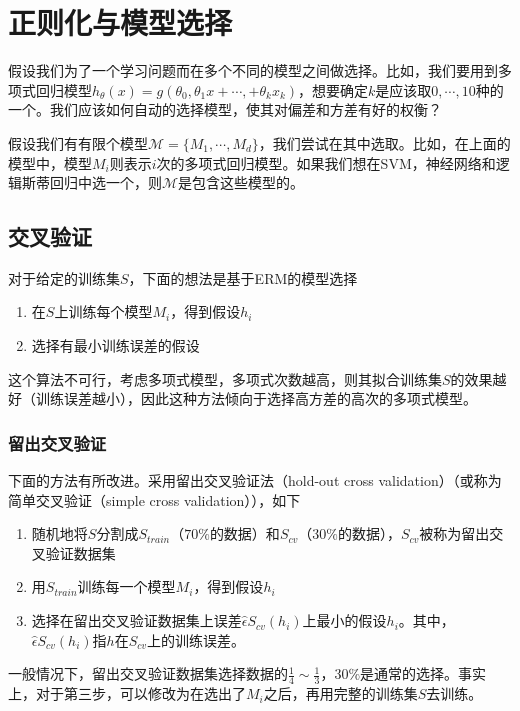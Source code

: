 \section{正则化与模型选择}
假设我们为了一个学习问题而在多个不同的模型之间做选择。比如，我们要用到多项式回归模型$h_\theta(x)=g(\theta_0,\theta_1x+\cdots,+\theta_kx_k)$，想要确定$k$是应该取$0,\cdots,10$种的一个。我们应该如何自动的选择模型，使其对偏差和方差有好的权衡？

假设我们有有限个模型$\mathcal{M}=\{M_1,\cdots,M_d\}$，我们尝试在其中选取。比如，在上面的模型中，模型$M_i$则表示$i$次的多项式回归模型。如果我们想在SVM，神经网络和逻辑斯蒂回归中选一个，则$\mathcal{M}$是包含这些模型的。

\subsection{交叉验证}
对于给定的训练集$S$，下面的想法是基于ERM的模型选择
\begin{enumerate}[1]
\item 在$S$上训练每个模型$M_i$，得到假设$h_i$
\item 选择有最小训练误差的假设
\end{enumerate}

这个算法不可行，考虑多项式模型，多项式次数越高，则其拟合训练集$S$的效果越好（训练误差越小），因此这种方法倾向于选择高方差的高次的多项式模型。
\subsubsection{留出交叉验证}
下面的方法有所改进。采用留出交叉验证法（hold-out cross validation）（或称为简单交叉验证（simple cross validation）），如下
\begin{enumerate}[1]
\item 随机地将$S$分割成$S_{train}$（$70\%$的数据）和$S_{cv}$（$30\%$的数据），$S_{cv}$被称为留出交叉验证数据集
\item 用$S_{train}$训练每一个模型$M_i$，得到假设$h_i$
\item 选择在留出交叉验证数据集上误差$\hat{\epsilon}S_{cv}(h_i)$上最小的假设$h_i$。其中，$\hat{\epsilon}S_{cv}(h_i)$指$h$在$S_{cv}$上的训练误差。
\end{enumerate}
一般情况下，留出交叉验证数据集选择数据的$\frac{1}{4}\sim\frac{1}{3}$，$30\%$是通常的选择。事实上，对于第三步，可以修改为在选出了$M_i$之后，再用完整的训练集$S$去训练。

